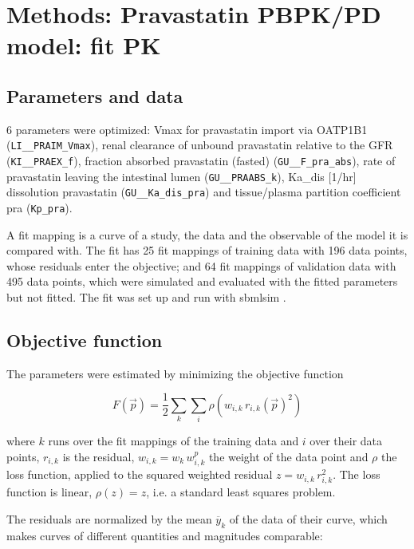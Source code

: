 \section{Methods: Pravastatin PBPK/PD model: fit PK}

\subsection{Parameters and data}

6 parameters were optimized: Vmax for pravastatin import via OATP1B1 (\texttt{LI\_\_PRAIM\_Vmax}), renal clearance of unbound pravastatin relative to the GFR (\texttt{KI\_\_PRAEX\_f}), fraction absorbed pravastatin (fasted) (\texttt{GU\_\_F\_pra\_abs}), rate of pravastatin leaving the intestinal lumen (\texttt{GU\_\_PRAABS\_k}), Ka\_dis [1/hr] dissolution pravastatin (\texttt{GU\_\_Ka\_dis\_pra}) and tissue/plasma partition coefficient pra (\texttt{Kp\_pra}).

A fit mapping is a curve of a study, the data and the observable of the model it is compared with. The fit has 25 fit mappings of training data with 196 data points, whose residuals enter the objective; and 64 fit mappings of validation data with 495 data points, which were simulated and evaluated with the fitted parameters but not fitted. The fit was set up and run with sbmlsim \cite{Koenig2026_sbmlsim}.

\subsection{Objective function}

The parameters were estimated by minimizing the objective function

\begin{equation}
F(\vec{p}) = \frac{1}{2} \sum_{k} \sum_{i} \rho\left(w_{i,k}\, r_{i,k}(\vec{p})^2\right)
\end{equation}

where $k$ runs over the fit mappings of the training data and $i$ over their data points, $r_{i,k}$ is the residual, $w_{i,k} = w_k\, w^{p}_{i,k}$ the weight of the data point and $\rho$ the loss function, applied to the squared weighted residual $z = w_{i,k}\, r_{i,k}^2$. The loss function is linear, $\rho(z) = z$, i.e. a standard least squares problem.

The residuals are normalized by the mean $\overline{y}_k$ of the data of their curve, which makes curves of different quantities and magnitudes comparable:

